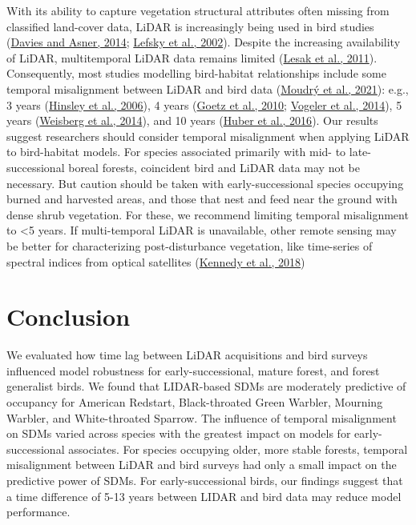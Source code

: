 \documentclass[
  12pt,
]{article}
\begin{document}
With its ability to capture vegetation structural attributes often missing from classified land-cover data, LiDAR is increasingly being used in bird studies (\protect\hyperlink{ref-Davies2014a}{Davies and Asner, 2014}; \protect\hyperlink{ref-Lefsky2002}{Lefsky et al., 2002}). Despite the increasing availability of LiDAR, multitemporal LiDAR data remains limited (\protect\hyperlink{ref-Lesak2011a}{Lesak et al., 2011}). Consequently, most studies modelling bird-habitat relationships include some temporal misalignment between LiDAR and bird data (\protect\hyperlink{ref-moudryRoleVegetationStructure2021}{Moudrý et al., 2021}): e.g., 3 years (\protect\hyperlink{ref-hinsleyApplicationLidarWoodland2006}{Hinsley et al., 2006}), 4 years (\protect\hyperlink{ref-Goetz2010}{Goetz et al., 2010}; \protect\hyperlink{ref-vogelerTerrainVegetationStructural2014a}{Vogeler et al., 2014}), 5 years (\protect\hyperlink{ref-Weisberg2014}{Weisberg et al., 2014}), and 10 years (\protect\hyperlink{ref-huberUsingRemotesensingData2016}{Huber et al., 2016}). Our results suggest researchers should consider temporal misalignment when applying LiDAR to bird-habitat models. For species associated primarily with mid- to late-successional boreal forests, coincident bird and LiDAR data may not be necessary. But caution should be taken with early-successional species occupying burned and harvested areas, and those that nest and feed near the ground with dense shrub vegetation. For these, we recommend limiting temporal misalignment to \textless5 years. If multi-temporal LiDAR is unavailable, other remote sensing may be better for characterizing post-disturbance vegetation, like time-series of spectral indices from optical satellites (\protect\hyperlink{ref-Kennedy2018}{Kennedy et al., 2018})

\hypertarget{conclusion}{%
\section{Conclusion}\label{conclusion}}

We evaluated how time lag between LiDAR acquisitions and bird surveys influenced model robustness for early-successional, mature forest, and forest generalist birds. We found that LIDAR-based SDMs are moderately predictive of occupancy for American Redstart, Black-throated Green Warbler, Mourning Warbler, and White-throated Sparrow. The influence of temporal misalignment on SDMs varied across species with the greatest impact on models for early-successional associates. For species occupying older, more stable forests, temporal misalignment between LiDAR and bird surveys had only a small impact on the predictive power of SDMs. For early-successional birds, our findings suggest that a time difference of 5-13 years between LIDAR and bird data may reduce model performance.
\end{document}
